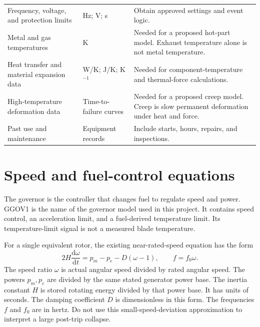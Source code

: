 \documentclass[11pt,a4paper]{report}
\newcommand{\dd}{\mathrm{d}}
\begin{document}
\begin{longtable}{L{0.22\textwidth}L{0.17\textwidth}L{0.49\textwidth}}
Frequency, voltage, and protection limits & Hz; V; s & Obtain approved settings and event logic. \\
Metal and gas temperatures & K & Needed for a proposed hot-part model. Exhaust temperature alone is not metal temperature. \\
Heat transfer and material expansion data & W/K; J/K; K$^{-1}$ & Needed for component-temperature and thermal-force calculations. \\
High-temperature deformation data & Time-to-failure curves & Needed for a proposed creep model. Creep is slow permanent deformation under heat and force. \\
Past use and maintenance & Equipment records & Include starts, hours, repairs, and inspections. \\
\bottomrule
\end{longtable}

\section{Speed and fuel-control equations}
The governor is the controller that changes fuel to regulate speed and power.
GGOV1 is the name of the governor model used in this project.
It contains speed control, an acceleration limit, and a fuel-derived temperature limit.
Its temperature-limit signal is not a measured blade temperature.

For a single equivalent rotor, the existing near-rated-speed equation has the form
\begin{equation}
2H\frac{\dd\omega}{\dd t}
=p_m-p_e-D(\omega-1),\qquad f=f_0\omega.
\label{eq:swing}
\end{equation}
The speed ratio $\omega$ is actual angular speed divided by rated angular speed.
The powers $p_m,p_e$ are divided by the same stated generator power base.
The inertia constant $H$ is stored rotating energy divided by that power base.
It has units of seconds.
The damping coefficient $D$ is dimensionless in this form.
The frequencies $f$ and $f_0$ are in hertz.
Do not use this small-speed-deviation approximation to interpret a large post-trip collapse.
\end{document}
